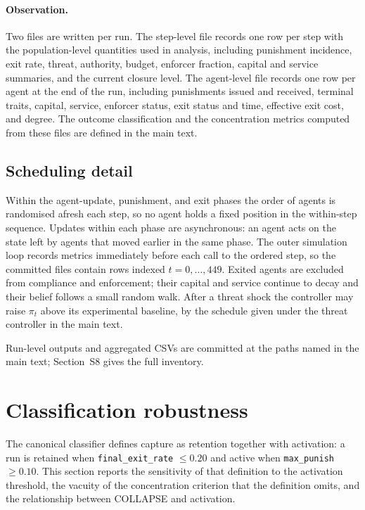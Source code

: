 \documentclass[12pt]{article}
\begin{document}
\paragraph{Observation.} Two files are written per run. The step-level file
records one row per step with the population-level quantities used in analysis,
including punishment incidence, exit rate, threat, authority, budget, enforcer
fraction, capital and service summaries, and the current closure level. The
agent-level file records one row per agent at the end of the run, including
punishments issued and received, terminal traits, capital, service, enforcer
status, exit status and time, effective exit cost, and degree. The outcome
classification and the concentration metrics computed from these files are
defined in the main text.

\subsection{Scheduling detail}

Within the agent-update, punishment, and exit phases the order of agents is
randomised afresh each step, so no agent holds a fixed position in the
within-step sequence. Updates within each phase are asynchronous: an agent acts
on the state left by agents that moved earlier in the same phase. The outer
simulation loop records metrics immediately before each call to the ordered
step, so the committed files contain rows indexed $t=0,\ldots,449$. Exited
agents are excluded from compliance and enforcement; their capital and service
continue to decay and their belief follows a small random walk. After a threat
shock the controller may raise $\pi_t$ above its experimental baseline, by the
schedule given under the threat controller in the main text.

Run-level outputs and aggregated CSVs are committed at the paths named in the
main text; Section~S8 gives the full inventory.

\clearpage

\section{Classification robustness}
\label{sec:robustness}

The canonical classifier defines capture as retention together with activation:
a run is retained when \texttt{final\_exit\_rate} $\leq 0.20$ and active when
\texttt{max\_punish} $\geq 0.10$. This section reports the sensitivity of that
definition to the activation threshold, the vacuity of the concentration
criterion that the definition omits, and the relationship between COLLAPSE and
activation.
\end{document}

